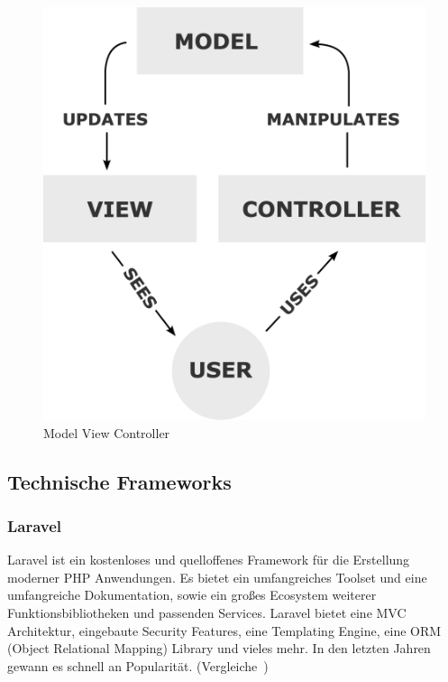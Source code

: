 \begin{figure}[h!]
    \centering
    \caption{Model View Controller}
    \label{fig:mvc}
    \includegraphics[scale=0.15]{assets/wikipedia_mvc_process}
\end{figure}

\newpage

\subsection{Technische Frameworks}

\subsubsection{Laravel}
Laravel ist ein kostenloses und quelloffenes Framework für die Erstellung moderner PHP Anwendungen.
Es bietet ein umfangreiches Toolset und eine umfangreiche Dokumentation, sowie ein großes Ecosystem weiterer Funktionsbibliotheken und passenden Services.
Laravel bietet eine MVC Architektur, eingebaute Security Features, eine Templating Engine, eine ORM (Object Relational Mapping) Library und vieles mehr.
In den letzten Jahren gewann es schnell an Popularität.
(Vergleiche~\cite{what-is-laravel})


